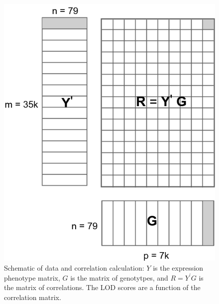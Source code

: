 \documentclass[9pt,twocolumn,twoside,lineno]{gsag3jnl}
\begin{document}
      \begin{figure}[!htb]

	\caption{Schematic of data and correlation calculation: $Y$ is
		the expression phenotype matrix, $G$ is the matrix of
		genotytpes, and $R=Y^{\prime}G$ is the matrix of
		correlations.  The LOD scores are a function of the
		correlation matrix.}
	\label{MatrixMult}
	\includegraphics[scale = .4]{figs/YGmatrix.png}
\end{figure}    


\end{document}
